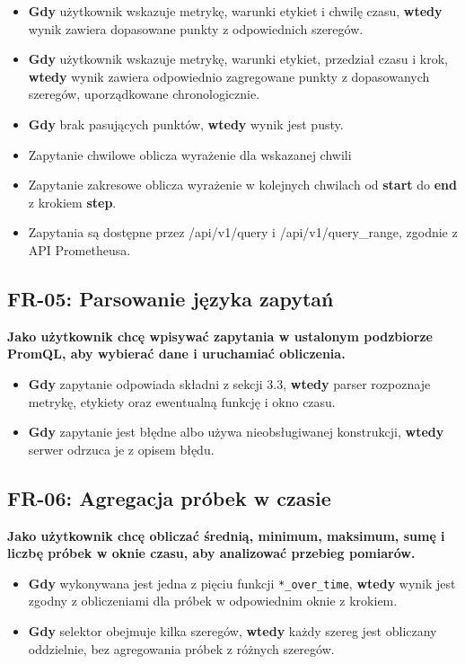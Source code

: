 \documentclass[12pt,a4paper]{article}
\begin{document}
\begin{itemize}
    \item \textbf{Gdy} użytkownik wskazuje metrykę, warunki etykiet i chwilę czasu, \textbf{wtedy} wynik zawiera dopasowane punkty z odpowiednich szeregów.
    \item \textbf{Gdy} użytkownik wskazuje metrykę, warunki etykiet, przedział czasu i krok, \textbf{wtedy} wynik zawiera odpowiednio zagregowane punkty z dopasowanych szeregów, uporządkowane chronologicznie.
    \item \textbf{Gdy} brak pasujących punktów, \textbf{wtedy} wynik jest pusty.
    \item Zapytanie chwilowe oblicza wyrażenie dla wskazanej chwili
    \item Zapytanie zakresowe oblicza wyrażenie w kolejnych chwilach od \textbf{start} do \textbf{end} z krokiem \textbf{step}.
    \item Zapytania są dostępne przez /api/v1/query i /api/v1/query\_range, zgodnie z API Prometheusa.
\end{itemize}


\subsection*{FR-05: Parsowanie języka zapytań}

\textbf{Jako użytkownik chcę wpisywać zapytania w ustalonym podzbiorze PromQL, aby wybierać dane i uruchamiać obliczenia.}

\begin{itemize}
    \item \textbf{Gdy} zapytanie odpowiada składni z sekcji 3.3, \textbf{wtedy} parser rozpoznaje metrykę, etykiety oraz ewentualną funkcję i okno czasu.
    \item \textbf{Gdy} zapytanie jest błędne albo używa nieobsługiwanej konstrukcji, \textbf{wtedy} serwer odrzuca je z opisem błędu.
\end{itemize}


\subsection*{FR-06: Agregacja próbek w czasie}

\textbf{Jako użytkownik chcę obliczać średnią, minimum, maksimum, sumę i liczbę próbek w oknie czasu, aby analizować przebieg pomiarów.}

\begin{itemize}
    \item \textbf{Gdy} wykonywana jest jedna z pięciu funkcji \texttt{*\_\allowbreak{}over\_\allowbreak{}time}, \textbf{wtedy} wynik jest zgodny z obliczeniami dla próbek w odpowiednim oknie z krokiem.
    \item \textbf{Gdy} selektor obejmuje kilka szeregów, \textbf{wtedy} każdy szereg jest obliczany oddzielnie, bez agregowania próbek z różnych szeregów.
\end{itemize}
\end{document}
